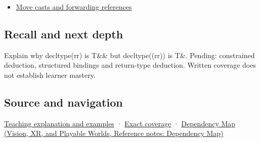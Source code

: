 \hypertarget{appendix-5d4252a42886-used-by}{}

\begin{itemize}
\tightlist
\item
  \hyperref[appendix-0104b704fb11]{Move casts and forwarding references}
\end{itemize}

\subsection{Recall and next depth}\label{appendix-5d4252a42886-recall-and-next-depth}

\hypertarget{appendix-5d4252a42886-recall-and-next-depth}{}

Explain why decltype(rr) is T\&\& but decltype((rr)) is T\&. Pending: constrained deduction, structured bindings and return-type deduction. Written coverage does not establish learner mastery.

\subsection{Source and navigation}\label{appendix-5d4252a42886-source-and-navigation}

\hypertarget{appendix-5d4252a42886-source-and-navigation}{}

\hyperref[01-foundations-i-ch003-an-expression-has-a-type-and-a-category]{Teaching explanation and examples} · \hyperref[appendix-fd090d982a15-m008---parts-113-126]{Exact coverage} · \href{../07-Vision-XR-and-Playable-Worlds/main.pdf\#nameddest=appendix-4ad47bdd269a}{Dependency Map (Vision, XR, and Playable Worlds, Reference notes: Dependency Map)}
